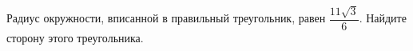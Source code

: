 \begin{ex}
	\begin{condition}
		Радиус окружности, вписанной в правильный треугольник, равен  \( \dfrac{11\sqrt{3}}{6} \).  Найдите сторону этого треугольника.
	\end{condition}
\end{ex}